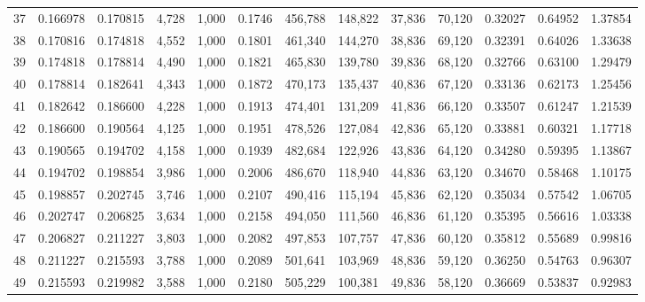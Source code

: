 \begin{tabular}{rrrrrrrrrrrrr}
37  &  0.166978 &  0.170815 &   4,728 &  1,000 &                                     0.1746 &  456,788 &  148,822 &   37,836 &   70,120 &  0.32027 &  0.64952 &  1.37854 \\
38  &  0.170816 &  0.174818 &   4,552 &  1,000 &                                     0.1801 &  461,340 &  144,270 &   38,836 &   69,120 &  0.32391 &  0.64026 &  1.33638 \\
39  &  0.174818 &  0.178814 &   4,490 &  1,000 &                                     0.1821 &  465,830 &  139,780 &   39,836 &   68,120 &  0.32766 &  0.63100 &  1.29479 \\
40  &  0.178814 &  0.182641 &   4,343 &  1,000 &                                     0.1872 &  470,173 &  135,437 &   40,836 &   67,120 &  0.33136 &  0.62173 &  1.25456 \\
41  &  0.182642 &  0.186600 &   4,228 &  1,000 &                                     0.1913 &  474,401 &  131,209 &   41,836 &   66,120 &  0.33507 &  0.61247 &  1.21539 \\
42  &  0.186600 &  0.190564 &   4,125 &  1,000 &                                     0.1951 &  478,526 &  127,084 &   42,836 &   65,120 &  0.33881 &  0.60321 &  1.17718 \\
43  &  0.190565 &  0.194702 &   4,158 &  1,000 &                                     0.1939 &  482,684 &  122,926 &   43,836 &   64,120 &  0.34280 &  0.59395 &  1.13867 \\
44  &  0.194702 &  0.198854 &   3,986 &  1,000 &                                     0.2006 &  486,670 &  118,940 &   44,836 &   63,120 &  0.34670 &  0.58468 &  1.10175 \\
45  &  0.198857 &  0.202745 &   3,746 &  1,000 &                                     0.2107 &  490,416 &  115,194 &   45,836 &   62,120 &  0.35034 &  0.57542 &  1.06705 \\
46  &  0.202747 &  0.206825 &   3,634 &  1,000 &                                     0.2158 &  494,050 &  111,560 &   46,836 &   61,120 &  0.35395 &  0.56616 &  1.03338 \\
47  &  0.206827 &  0.211227 &   3,803 &  1,000 &                                     0.2082 &  497,853 &  107,757 &   47,836 &   60,120 &  0.35812 &  0.55689 &  0.99816 \\
48  &  0.211227 &  0.215593 &   3,788 &  1,000 &                                     0.2089 &  501,641 &  103,969 &   48,836 &   59,120 &  0.36250 &  0.54763 &  0.96307 \\
49  &  0.215593 &  0.219982 &   3,588 &  1,000 &                                     0.2180 &  505,229 &  100,381 &   49,836 &   58,120 &  0.36669 &  0.53837 &  0.92983 \\

\end{tabular}
